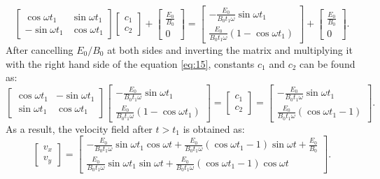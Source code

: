 \documentclass[11pt]{amsart}
\begin{document}
\begin{equation}
\label{eq:15}
\begin{bmatrix}
 \cos{\omega t_1} & \sin{\omega t_1} \\ 
- \sin{\omega t_1} & \cos{\omega t_1}
\end{bmatrix}
\begin{bmatrix}
c_1  \\ 
 c_2
\end{bmatrix}
+
\begin{bmatrix}
\frac{E_0 }{B_0}\\ 
0
\end{bmatrix}
=
\begin{bmatrix}
-\frac{E_0 }{B_0 t_1 \omega}\sin{\omega t_1}\\ 
\frac{E_0 }{B_0 t_1 \omega}(1-\cos{\omega t_1})
\end{bmatrix}
+
\begin{bmatrix}
\frac{E_0 }{B_0}\\ 
0
\end{bmatrix}
.
\end{equation}
After cancelling $E_0/B_0$ at both sides and inverting the matrix and multiplying it with the right hand side of the equation \ref{eq:15}, constants $c_1$ and $c_2$ can be found as:
\begin{equation}
\label{eq:16}
\begin{bmatrix}
 \cos{\omega t_1} & -\sin{\omega t_1} \\ 
 \sin{\omega t_1} & \cos{\omega t_1}
\end{bmatrix}
\begin{bmatrix}
-\frac{E_0 }{B_0 t_1 \omega}\sin{\omega t_1}\\ 
\frac{E_0 }{B_0 t_1 \omega}(1-\cos{\omega t_1})
\end{bmatrix}
=
\begin{bmatrix}
c_1  \\ 
 c_2
\end{bmatrix}
=
\begin{bmatrix}
-\frac{E_0 }{B_0 t_1 \omega}\sin{\omega t_1} \\ 
 \frac{E_0 }{B_0 t_1 \omega}(\cos{\omega t_1}-1)
\end{bmatrix}
.
\end{equation}
As a result, the velocity field after $t>t_1$ is obtained as:
\begin{equation}
\label{eq:17}
\begin{bmatrix}
v_x\\ 
v_y
\end{bmatrix}
=
\begin{bmatrix}
-\frac{E_0 }{B_0 t_1 \omega}\sin{\omega t_1} \cos{\omega t} +  \frac{E_0 }{B_0 t_1 \omega}(\cos{\omega t_1}-1) \sin{\omega t} +\frac{E_0}{B_0} \\ 
\frac{E_0 }{B_0 t_1 \omega}\sin{\omega t_1} \sin{\omega t} +  \frac{E_0 }{B_0 t_1 \omega}(\cos{\omega t_1}-1)\cos{\omega t}
\end{bmatrix}.
\end{equation}
\end{document}
